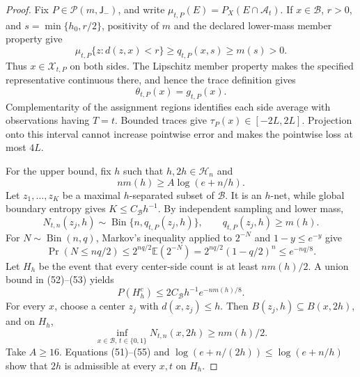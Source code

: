 \documentclass{article}
\begin{document}
\begin{proof}
Fix \(P\in\mathcal P(m,\mathsf J_{-})\), and write
\(\mu_{t,P}(E)=P_X(E\cap\mathcal A_t)\).  If \(x\in\mathcal B\),
\(r>0\), and \(s=\min\{h_0,r/2\}\), positivity of \(m\) and the declared
lower-mass member property give
\[
 \mu_{t,P}\{z:d(z,x)<r\}\ge q_{t,P}(x,s)\ge m(s)>0.
 \tag{49}
\]
Thus \(x\in\mathcal X_{t,P}\) on both sides.  The Lipschitz member
property makes the specified representative continuous there, and hence
the trace definition gives
\[
 \theta_{t,P}(x)=g_{t,P}(x).
 \tag{50}
\]
Complementarity of the assignment regions identifies each side average
with observations having \(T=t\).  Bounded traces give
\(\tau_P(x)\in[-2L,2L]\).  Projection onto this interval cannot increase
pointwise error and makes the pointwise loss at most \(4L\).

For the upper bound, fix \(h\) such that \(h,2h\in\mathcal H_n\) and
\[
 nm(h)\ge A\log(e+n/h).
 \tag{51}
\]
Let \(z_1,\ldots,z_K\) be a maximal \(h\)-separated subset of
\(\mathcal B\).  It is an \(h\)-net, while global boundary entropy gives
\(K\le C_{\mathcal B}h^{-1}\).  By independent sampling and lower mass,
\[
 N_{t,n}(z_j,h)\sim\operatorname{Bin}\{n,q_{t,P}(z_j,h)\},
 \qquad q_{t,P}(z_j,h)\ge m(h).
 \tag{52}
\]
For \(N\sim\operatorname{Bin}(n,q)\), Markov's inequality applied to
\(2^{-N}\) and \(1-y\le e^{-y}\) give
\[
 \Pr(N\le nq/2)
 \le2^{nq/2}\mathbb E(2^{-N})
 =2^{nq/2}(1-q/2)^n
 \le e^{-nq/8}.
 \tag{53}
\]
Let \(H_h\) be the event that every center-side count is at least
\(nm(h)/2\).  A union bound in (52)--(53) yields
\[
 P(H_h^c)\le2C_{\mathcal B}h^{-1}e^{-nm(h)/8}.
 \tag{54}
\]
For every \(x\), choose a center \(z_j\) with \(d(x,z_j)\le h\).  Then
\(B(z_j,h)\subseteq B(x,2h)\), and on \(H_h\),
\[
 \inf_{x\in\mathcal B,\,t\in\{0,1\}}N_{t,n}(x,2h)
 \ge nm(h)/2.
 \tag{55}
\]
Take \(A\ge16\).  Equations (51)--(55) and
\(\log(e+n/(2h))\le\log(e+n/h)\) show that \(2h\) is admissible at every
\(x,t\) on \(H_h\).


\end{proof}
\end{document}
